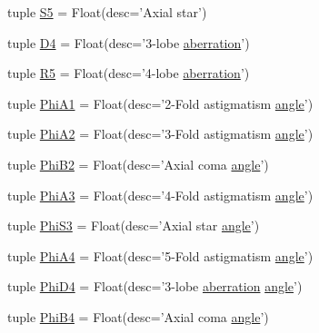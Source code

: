 \begin{DoxyCompactItemize}
\item 
tuple \hyperlink{classaberrations_1_1_ab_rose_ae677d3a96dbbd0bffdf74551ef298f94}{S5} = Float(desc='Axial star')
\item 
tuple \hyperlink{classaberrations_1_1_ab_rose_a1d4d0384c503620e8d84cf1cf6a5be3e}{D4} = Float(desc='3-\/lobe \hyperlink{aberrations___t_e_m_8m_add6b7c5f8447a629106b3fae4a009eb8}{aberration}')
\item 
tuple \hyperlink{classaberrations_1_1_ab_rose_ad948cbe69d7cd14210dff4f94634b029}{R5} = Float(desc='4-\/lobe \hyperlink{aberrations___t_e_m_8m_add6b7c5f8447a629106b3fae4a009eb8}{aberration}')
\item 
tuple \hyperlink{classaberrations_1_1_ab_rose_a2c472cb55b3bfa8b0a338f9a5724d441}{Phi\-A1} = Float(desc='2-\/Fold astigmatism \hyperlink{image_sim_8m_a0a2c0e3061e6dfed2bb93e1d6a220939}{angle}')
\item 
tuple \hyperlink{classaberrations_1_1_ab_rose_a69b11a8a41302834a847a94e4cd3c179}{Phi\-A2} = Float(desc='3-\/Fold astigmatism \hyperlink{image_sim_8m_a0a2c0e3061e6dfed2bb93e1d6a220939}{angle}')
\item 
tuple \hyperlink{classaberrations_1_1_ab_rose_a6d2ad1d6f5c338d647ed7e35f39b7e0b}{Phi\-B2} = Float(desc='Axial coma \hyperlink{image_sim_8m_a0a2c0e3061e6dfed2bb93e1d6a220939}{angle}')
\item 
tuple \hyperlink{classaberrations_1_1_ab_rose_a823c4123539f2644a44a89e11932c4d8}{Phi\-A3} = Float(desc='4-\/Fold astigmatism \hyperlink{image_sim_8m_a0a2c0e3061e6dfed2bb93e1d6a220939}{angle}')
\item 
tuple \hyperlink{classaberrations_1_1_ab_rose_ab6a800ce8358e7d22854b901350e439a}{Phi\-S3} = Float(desc='Axial star \hyperlink{image_sim_8m_a0a2c0e3061e6dfed2bb93e1d6a220939}{angle}')
\item 
tuple \hyperlink{classaberrations_1_1_ab_rose_a19bbbad8124fe76e728a7fde8df1b692}{Phi\-A4} = Float(desc='5-\/Fold astigmatism \hyperlink{image_sim_8m_a0a2c0e3061e6dfed2bb93e1d6a220939}{angle}')
\item 
tuple \hyperlink{classaberrations_1_1_ab_rose_ae946b39d53484d8e706e4c87cadc2d66}{Phi\-D4} = Float(desc='3-\/lobe \hyperlink{aberrations___t_e_m_8m_add6b7c5f8447a629106b3fae4a009eb8}{aberration} \hyperlink{image_sim_8m_a0a2c0e3061e6dfed2bb93e1d6a220939}{angle}')
\item 
tuple \hyperlink{classaberrations_1_1_ab_rose_afb3143dccb0c1f6b4b15eaef3616f953}{Phi\-B4} = Float(desc='Axial coma \hyperlink{image_sim_8m_a0a2c0e3061e6dfed2bb93e1d6a220939}{angle}')
\item 

\end{DoxyCompactItemize}
